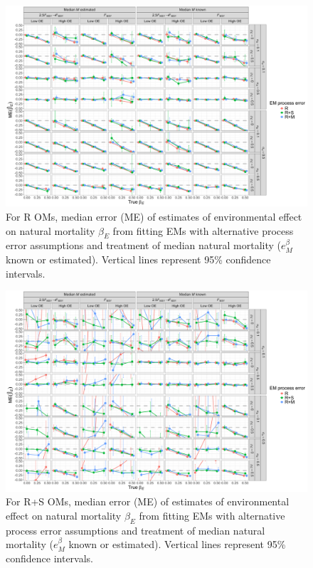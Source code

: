 \documentclass[
  12pt,
]{article}
\begin{document}
\begin{landscape}
\begin{figure}
\begin{center}
\includegraphics[height = \textheight]{beta_E_bias_Rom}
\end{center}
\caption{For R OMs, median error (ME) of estimates of environmental effect on natural mortality $\beta_E$ from fitting EMs with alternative process error assumptions and treatment of median natural mortality ($e^\beta_M$ known or estimated). Vertical lines represent 95\% confidence intervals.}\label{beta_E_bias_Rom}
\end{figure}
\end{landscape}

\begin{landscape}
\begin{figure}
\begin{center}
\includegraphics[height = \textheight]{beta_E_bias_RSom}
\end{center}
\caption{For R+S OMs, median error (ME) of estimates of environmental effect on natural mortality $\beta_E$ from fitting EMs with alternative process error assumptions and treatment of median natural mortality ($e^\beta_M$ known or estimated). Vertical lines represent 95\% confidence intervals.}\label{beta_E_bias_RSom}
\end{figure}
\end{landscape}
\end{document}
